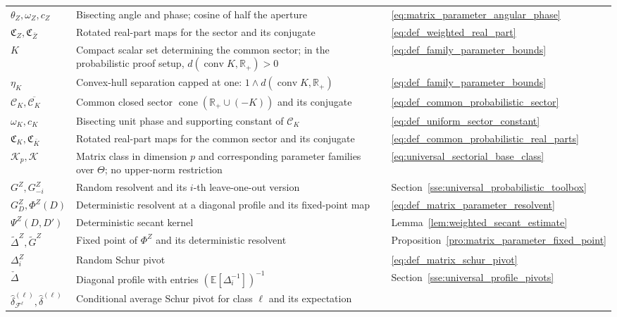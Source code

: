 \documentclass[EJP, preprint, NODS, nobera, nofontexpansion]{ejpecp}
\begin{document}
{\begin{longtable}{@{}
>{\raggedright\arraybackslash}p{}
>{\raggedright\arraybackslash}p{}
>{\raggedright\arraybackslash}p{}
@{}}
$\theta_Z,\omega_Z,c_Z$
& Bisecting angle and phase; cosine of half the aperture
& \eqref{eq:matrix_parameter_angular_phase} \\
$\mathfrak C_Z,\mathfrak C_{\bar Z}$
& Rotated real-part maps for the sector and its conjugate
& \eqref{eq:def_weighted_real_part} \\
$K$
& Compact scalar set determining the common sector; in the probabilistic proof setup, $d(\operatorname{conv}K,\mathbb R_+)>0$
& \eqref{eq:def_family_parameter_bounds} \\
$\eta_K$
& Convex-hull separation capped at one: $1\wedge d(\operatorname{conv}K,\mathbb R_+)$
& \eqref{eq:def_family_parameter_bounds} \\
$\mathcal C_K,\overline{\mathcal C_K}$
& Common closed sector $\operatorname{cone}(\mathbb R_+\cup(-K))$ and its conjugate
& \eqref{eq:def_common_probabilistic_sector} \\
$\omega_K,c_K$
& Bisecting unit phase and supporting constant of $\mathcal C_K$
& \eqref{eq:def_uniform_sector_constant} \\
$\mathfrak C_K,\mathfrak C_{\bar K}$
& Rotated real-part maps for the common sector and its conjugate
& \eqref{eq:def_common_probabilistic_real_parts} \\
$\mathcal K_p,\mathcal K$
& Matrix class in dimension $p$ and corresponding parameter families over $\Theta$; no upper-norm restriction
& \eqref{eq:universal_sectorial_base_class} \\
$G^Z,G_{-i}^Z$
& Random resolvent and its $i$-th leave-one-out version
& Section~\ref{sse:universal_probabilistic_toolbox} \\
$G_D^Z,\Phi^Z(D)$
& Deterministic resolvent at a diagonal profile and its fixed-point map
& \eqref{eq:def_matrix_parameter_resolvent} \\
$\Psi^Z(D,D')$
& Deterministic secant kernel
& Lemma~\ref{lem:weighted_secant_estimate} \\
$\widetilde\Delta^Z,\widetilde G^Z$
& Fixed point of $\Phi^Z$ and its deterministic resolvent
& Proposition~\ref{pro:matrix_parameter_fixed_point} \\
$\Delta_i^Z$
& Random Schur pivot
& \eqref{eq:def_matrix_schur_pivot} \\
$\check\Delta$
& Diagonal profile with entries $(\mathbb E[\Delta_i^{-1}])^{-1}$
& Section~\ref{sse:universal_profile_pivots} \\
$\widehat\delta_{\mathcal F^{\ell}}^{(\ell)},\widehat\delta^{(\ell)}$
& Conditional average Schur pivot for class $\ell$ and its expectation

\end{longtable}}
\end{document}

